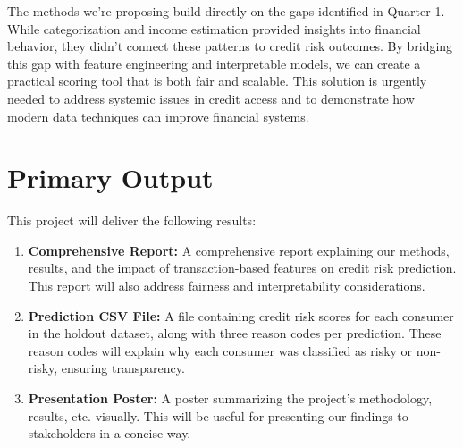 \documentclass[12pt,letterpaper]{article}
\begin{document}
The methods we’re proposing build directly on the gaps identified in Quarter 1. While categorization and income estimation provided insights into financial behavior, they didn’t connect these patterns to credit risk outcomes. By bridging this gap with feature engineering and interpretable models, we can create a practical scoring tool that is both fair and scalable. This solution is urgently needed to address systemic issues in credit access and to demonstrate how modern data techniques can improve financial systems.


\section{Primary Output}
This project will deliver the following results:
\begin{enumerate}
    \item \textbf{Comprehensive Report:} A comprehensive report explaining our methods, results, and the impact of transaction-based features on credit risk prediction. This report will also address fairness and interpretability considerations.
    \item \textbf{Prediction CSV File:} A file containing credit risk scores for each consumer in the holdout dataset, along with three reason codes per prediction. These reason codes will explain why each consumer was classified as risky or non-risky, ensuring transparency.
    \item \textbf{Presentation Poster:} A poster summarizing the project’s methodology, results, etc. visually. This will be useful for presenting our findings to stakeholders in a concise way.
\end{enumerate}
\end{document}
